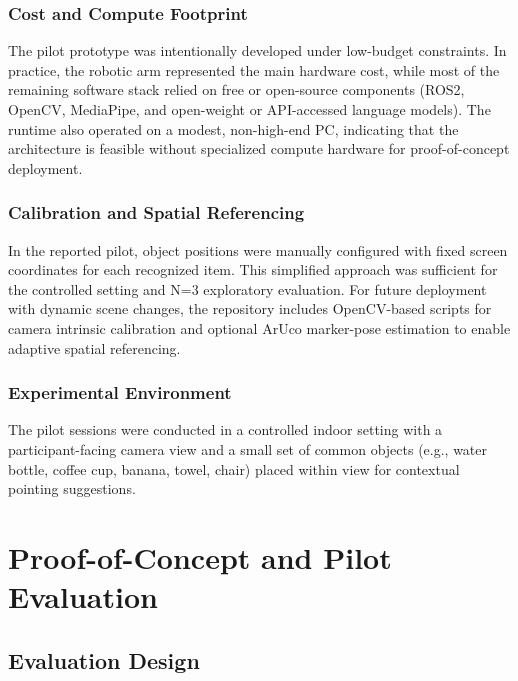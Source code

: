 \documentclass[pdflatex,sn-basic,Numbered,iicol,twocolumn]{sn-jnl}%
\begin{document}
\subsubsection{Cost and Compute Footprint}

The pilot prototype was intentionally developed under low-budget constraints. In practice, the robotic arm represented the main hardware cost, while most of the remaining software stack relied on free or open-source components (ROS2, OpenCV, MediaPipe, and open-weight or API-accessed language models). The runtime also operated on a modest, non-high-end PC, indicating that the architecture is feasible without specialized compute hardware for proof-of-concept deployment.

\subsubsection{Calibration and Spatial Referencing}

In the reported pilot, object positions were manually configured with fixed screen coordinates for each recognized item. This simplified approach was sufficient for the controlled setting and N=3 exploratory evaluation. For future deployment with dynamic scene changes, the repository includes OpenCV-based scripts for camera intrinsic calibration and optional ArUco marker-pose estimation to enable adaptive spatial referencing.

\subsubsection{Experimental Environment}

The pilot sessions were conducted in a controlled indoor setting with a participant-facing camera view and a small set of common objects (e.g., water bottle, coffee cup, banana, towel, chair) placed within view for contextual pointing suggestions.
\section{Proof-of-Concept and Pilot Evaluation}
\label{sec:evaluation}

\subsection{Evaluation Design}
\end{document}
